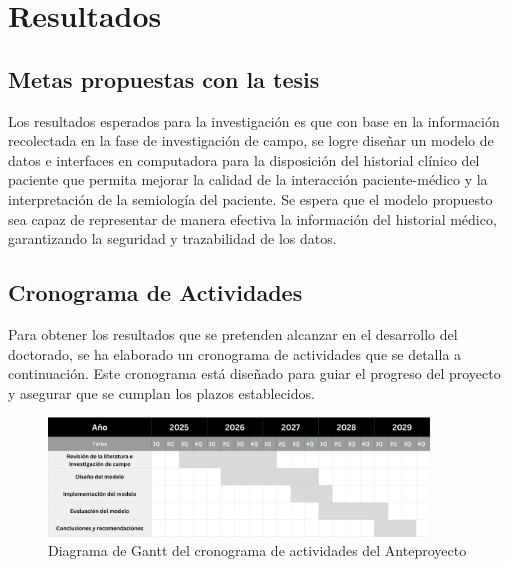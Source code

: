 \section{Resultados}
    \subsection{Metas propuestas con la tesis}
    Los resultados esperados para la investigación es que con base en la información recolectada en la fase de investigación de campo, se logre diseñar un modelo de datos e interfaces en computadora para la disposición del historial clínico del paciente que permita mejorar la calidad de la interacción paciente-médico y la interpretación de la semiología del paciente. Se espera que el modelo propuesto sea capaz de representar de manera efectiva la información del historial médico, garantizando la seguridad y trazabilidad de los datos.
    \subsection{Cronograma de Actividades}
    Para obtener los resultados que se pretenden alcanzar en el desarrollo del doctorado, se ha elaborado un cronograma de actividades que se detalla a continuación. Este cronograma está diseñado para guiar el progreso del proyecto y asegurar que se cumplan los plazos establecidos.
    \vspace{1em}

    \begin{figure} [H]
    \centering
    \includegraphics[width=0.9\textwidth]{images/gantt.png}
    \caption{Diagrama de Gantt del cronograma de actividades del Anteproyecto}    
    \end{figure}